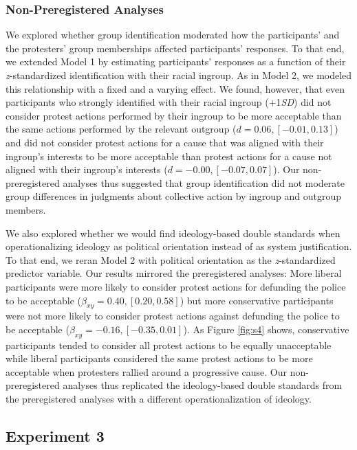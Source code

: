 \documentclass[12pt, letterpaper]{article}
\begin{document}
\hypertarget{non-preregistered-analyses}{%
\subsubsection{Non-Preregistered
Analyses}\label{non-preregistered-analyses}}

We explored whether group identification moderated how the participants'
and the protesters' group memberships affected participants' responses.
To that end, we extended Model 1 by estimating participants' responses
as a function of their \emph{z}-standardized identification with their
racial ingroup. As in Model 2, we modeled this relationship with a fixed
and a varying effect. We found, however, that even participants who
strongly identified with their racial ingroup (+1\emph{SD}) did not
consider protest actions performed by their ingroup to be more
acceptable than the same actions performed by the relevant outgroup
(\(d = 0.06, [-0.01, 0.13]\)) and did not consider protest actions for a
cause that was aligned with their ingroup's interests to be more
acceptable than protest actions for a cause not aligned with their
ingroup's interests (\(d = -0.00, [-0.07, 0.07]\)). Our
non-preregistered analyses thus suggested that group identification did
not moderate group differences in judgments about collective action by
ingroup and outgroup members.

We also explored whether we would find ideology-based double standards
when operationalizing ideology as political orientation instead of as
system justification. To that end, we reran Model 2 with political
orientation as the \emph{z}-standardized predictor variable. Our results
mirrored the preregistered analyses: More liberal participants were more
likely to consider protest actions for defunding the police to be
acceptable (\(\beta_{xy} = 0.40, [0.20, 0.58]\)) but more conservative
participants were not more likely to consider protest actions against
defunding the police to be acceptable
(\(\beta_{xy} = -0.16, [-0.35, 0.01]\)). As Figure \ref{fig:s4} shows,
conservative participants tended to consider all protest actions to be
equally unacceptable while liberal participants considered the same
protest actions to be more acceptable when protesters rallied around a
progressive cause. Our non-preregistered analyses thus replicated the
ideology-based double standards from the preregistered analyses with a
different operationalization of ideology.

\hypertarget{experiment-3-1}{%
\subsection{Experiment 3}\label{experiment-3-1}}
\end{document}
